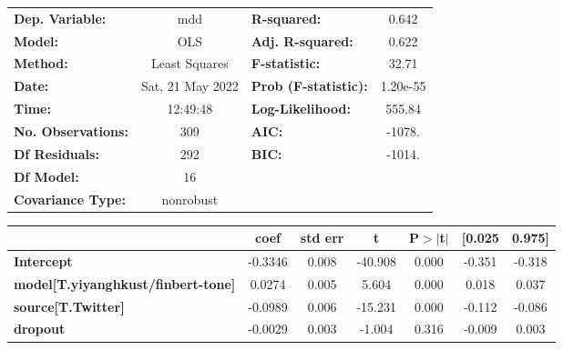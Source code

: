 \begin{center}
\begin{tabular}{lclc}
\toprule
\textbf{Dep. Variable:}                    &       mdd        & \textbf{  R-squared:         } &     0.642   \\
\textbf{Model:}                            &       OLS        & \textbf{  Adj. R-squared:    } &     0.622   \\
\textbf{Method:}                           &  Least Squares   & \textbf{  F-statistic:       } &     32.71   \\
\textbf{Date:}                             & Sat, 21 May 2022 & \textbf{  Prob (F-statistic):} &  1.20e-55   \\
\textbf{Time:}                             &     12:49:48     & \textbf{  Log-Likelihood:    } &    555.84   \\
\textbf{No. Observations:}                 &         309      & \textbf{  AIC:               } &    -1078.   \\
\textbf{Df Residuals:}                     &         292      & \textbf{  BIC:               } &    -1014.   \\
\textbf{Df Model:}                         &          16      & \textbf{                     } &             \\
\textbf{Covariance Type:}                  &    nonrobust     & \textbf{                     } &             \\
\bottomrule
\end{tabular}
\begin{tabular}{lcccccc}
                                           & \textbf{coef} & \textbf{std err} & \textbf{t} & \textbf{P$> |$t$|$} & \textbf{[0.025} & \textbf{0.975]}  \\
\midrule
\textbf{Intercept}                         &      -0.3346  &        0.008     &   -40.908  &         0.000        &       -0.351    &       -0.318     \\
\textbf{model[T.yiyanghkust/finbert-tone]} &       0.0274  &        0.005     &     5.604  &         0.000        &        0.018    &        0.037     \\
\textbf{source[T.Twitter]}                 &      -0.0989  &        0.006     &   -15.231  &         0.000        &       -0.112    &       -0.086     \\
\textbf{dropout}                           &      -0.0029  &        0.003     &    -1.004  &         0.316        &       -0.009    &        0.003     \\

\end{tabular}
\end{center}

